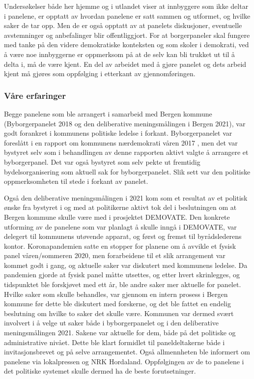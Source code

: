 \documentclass[
  12pt,
  a4paper, 12pt]{article}
\begin{document}
Undersøkelser både her hjemme og i utlandet viser at innbyggere som ikke deltar i panelene, er opptatt av hvordan panelene er satt sammen og utformet, og hvilke saker de tar opp. Men de er også opptatt av at panelets diskusjoner, eventuelle avstemninger og anbefalinger blir offentliggjort. For at borgerpaneler skal fungere med tanke på den videre demokratiske konteksten og som skoler i demokrati, ved å være noe innbyggerne er oppmerksom på at de selv kan bli trukket ut til å delta i, må de være kjent. En del av arbeidet med å gjøre panelet og dets arbeid kjent må gjøres som oppfølging i etterkant av gjennomføringen.

\hypertarget{vuxe5re-erfaringer-6}{%
\subsubsection{Våre erfaringer}\label{vuxe5re-erfaringer-6}}

Begge panelene som ble arrangert i samarbeid med Bergen kommune (Byborgerpanelet 2018 og den deliberative meningsmålingen i Bergen 2021), var godt forankret i kommunens politiske ledelse i forkant. Byborgerpanelet var foreslått i en rapport om kommunens nærdemokrati våren 2017 , men det var bystyret selv som i behandlingen av denne rapporten aktivt valgte å arrangere et byborgerpanel. Det var også bystyret som selv pekte ut fremtidig bydelsorganisering som aktuell sak for byborgerpanelet. Slik sett var den politiske oppmerksomheten til stede i forkant av panelet.

Også den deliberative meningsmålingen i 2021 kom som et resultat av et politisk ønske fra bystyret i og med at politikerne aktivt tok del i beslutningen om at Bergen kommune skulle være med i prosjektet DEMOVATE. Den konkrete utforming av de panelene som var planlagt å skulle inngå i DEMOVATE, var delegert til kommunens utøvende apparat, og først og fremst til byrådslederens kontor. Koronapandemien satte en stopper for planene om å avvikle et fysisk panel våren/sommeren 2020, men forarbeidene til et slik arrangement var kommet godt i gang, og aktuelle saker var diskutert med kommunens ledelse. Da pandemien gjorde at fysisk panel måtte utsettes, og etter hvert skrinlegges, og tidspunktet ble forskjøvet med ett år, ble andre saker mer aktuelle for panelet. Hvilke saker som skulle behandles, var gjennom en intern prosess i Bergen kommune før dette ble diskutert med forskerne, og det ble fattet en endelig beslutning om hvilke to saker det skulle være.
Kommunen var dermed svært involvert i å velge ut saker både i byborgerpanelet og i den deliberative meningsmålingen 2021. Sakene var aktuelle for dem, både på det politiske og administrative nivået. Dette ble klart formidlet til paneldeltakerne både i invitasjonsbrevet og på selve arrangementet. Også allmennheten ble informert om panelene via lokalpressen og NRK Hordaland. Oppfølgingen av de to panelene i det politiske systemet skulle dermed ha de beste forutsetninger.
\end{document}
